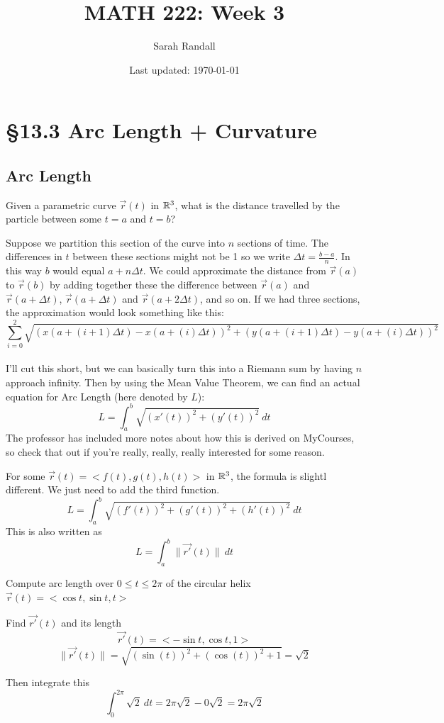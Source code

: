 \documentclass[12 pt]{article}
\author{Sarah Randall}
\date{Last updated: \today}
\title{MATH 222: Week 3}
\begin{document}
    \onehalfspacing
    \maketitle
    \tableofcontents
    \section{\S 13.3 Arc Length + Curvature}
        \subsection{Arc Length}
        Given a parametric curve $\vec{r}(t)$ in $\mathbb{R}^3$, what is the distance travelled by the particle between some $t=a$ and $t=b$?

        Suppose we partition this section of the curve into $n$ sections of time. The differences in $t$ between these sections might not be 1 so we write $\Delta t=\frac{b-a}{n}$. In this way $b$ would equal $a+n\Delta t$. We could approximate the distance from $\vec{r}(a)$ to $\vec{r}(b)$ by adding together these the difference between $\vec{r}(a)$ and $\vec{r}(a+\Delta t)$, $\vec{r}(a+\Delta t)$ and $\vec{r}(a+2\Delta t)$, and so on. If we had three sections, the approximation would look something like this:
        $$\sum_{i=0}^2\sqrt{(x(a+(i+1)\Delta t)-x(a+(i)\Delta t))^2+(y(a+(i+1)\Delta t)-y(a+(i)\Delta t))^2}$$\\

        I'll cut this short, but we can basically turn this into a Riemann sum by having $n$ approach infinity. Then by using the Mean Value Theorem, we can find an actual equation for Arc Length (here denoted by $L$):
        $$L=\int_a^b \sqrt{(x'(t))^2+(y'(t))^2}\ dt$$
        The professor has included more notes about how this is derived on MyCourses, so check that out if you're really, really, really interested for some reason.

        For some $\vec{r}(t)=<f(t),g(t),h(t)>$ in $\mathbb{R}^3$, the formula is slightl different. We just need to add the third function.
        $$L=\int_a^b \sqrt{(f'(t))^2+(g'(t))^2+(h'(t))^2}\ dt$$
        This is also written as
        $$L=\int_a^b\parallel \vec{r'}(t)\parallel\ dt$$

        \begin{exmp*}
            Compute arc length over $0\leq t\leq2\pi$ of the circular helix $\vec{r}(t)=<\cos{t},\sin{t},t>$

            Find $\vec{r'}(t)$ and its length
            $$\vec{r'}(t)=<-\sin{t},\cos{t},1>$$
            $$\parallel\vec{r'}(t)\parallel=\sqrt{(\sin(t))^2+(\cos(t))^2+1}=\sqrt{2}$$

            Then integrate this
            $$\int_0^{2\pi}\sqrt{2}\ dt=2\pi\sqrt{2}-0\sqrt{2}=2\pi\sqrt{2}$$
        \end{exmp*}
\end{document}
